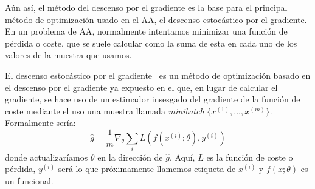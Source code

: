 Aún así, el método del descenso por el gradiente es la base para el principal método de optimización usado en el \ac{AA}, el descenso estocástico por el gradiente. En un problema de \ac{AA}, normalmente intentamos minimizar una función de pérdida o coste, que se suele calcular como la suma de esta en cada uno de los valores de la muestra que usamos. 

El descenso estocástico por el gradiente~\cite{Goodfellow-et-al-2016} es un método de optimización basado en el descenso por el gradiente ya expuesto en el que, en lugar de calcular el gradiente, se hace uso de un estimador insesgado del gradiente de la función de coste mediante el uso una muestra llamada \textit{minibatch} $\{ x^{(1)}, \ldots, x^{(m)}\}$. Formalmente sería:
\begin{equation}
    \hat{g} = \frac{1}{m}\nabla_\theta \sum_i L(f(x^{(i)}; \theta), y^{(i)})
\end{equation}
donde actualizaríamos $\theta$ en la dirección de $\hat{g}$. Aquí, $L$ es la función de coste o pérdida, $y^{(i)}$ será lo que próximamente llamemos etiqueta de $x^{(i)}$ y $f(x;\theta)$ es un funcional.